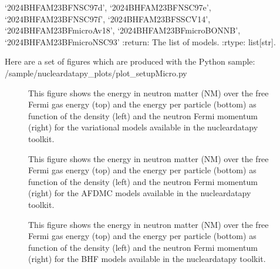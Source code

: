 \documentclass[letterpaper,10pt,english]{sphinxmanual}
\begin{document}
\begin{fulllineitems}
‘2024\sphinxhyphen{}BHF\sphinxhyphen{}AM\sphinxhyphen{}23BF\sphinxhyphen{}NSC97d’,     ‘2024\sphinxhyphen{}BHF\sphinxhyphen{}AM\sphinxhyphen{}23BF\sphinxhyphen{}NSC97e’, ‘2024\sphinxhyphen{}BHF\sphinxhyphen{}AM\sphinxhyphen{}23BF\sphinxhyphen{}NSC97f’, ‘2024\sphinxhyphen{}BHF\sphinxhyphen{}AM\sphinxhyphen{}23BF\sphinxhyphen{}SSCV14’,    ‘2024\sphinxhyphen{}BHF\sphinxhyphen{}AM\sphinxhyphen{}23BFmicro\sphinxhyphen{}Av18’, ‘2024\sphinxhyphen{}BHF\sphinxhyphen{}AM\sphinxhyphen{}23BFmicro\sphinxhyphen{}BONNB’, ‘2024\sphinxhyphen{}BHF\sphinxhyphen{}AM\sphinxhyphen{}23BFmicro\sphinxhyphen{}NSC93’
:return: The list of models.
:rtype: list{[}str{]}.

\end{fulllineitems}


\sphinxAtStartPar
Here are a set of figures which are produced with the Python sample: /sample/nucleardatapy\_plots/plot\_setupMicro.py

\begin{figure}[htbp]
\centering
\capstart

\noindent{}
\caption{This figure shows the energy in neutron matter (NM) over the free Fermi gas energy (top) and the energy per particle (bottom) as function of the density (left) and the neutron Fermi momentum (right) for the variational models available in the nucleardatapy toolkit.}\label{\detokenize{source/api/setup_micro:id1}}\end{figure}

\begin{figure}[htbp]
\centering
\capstart

\noindent{}
\caption{This figure shows the energy in neutron matter (NM) over the free Fermi gas energy (top) and the energy per particle (bottom) as function of the density (left) and the neutron Fermi momentum (right) for the AFDMC models available in the nucleardatapy toolkit.}\label{\detokenize{source/api/setup_micro:id2}}\end{figure}

\begin{figure}[htbp]
\centering
\capstart

\noindent{}
\caption{This figure shows the energy in neutron matter (NM) over the free Fermi gas energy (top) and the energy per particle (bottom) as function of the density (left) and the neutron Fermi momentum (right) for the BHF models available in the nucleardatapy toolkit.}\label{\detokenize{source/api/setup_micro:id3}}\end{figure}
\end{document}
